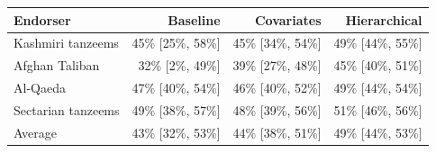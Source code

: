 \begin{tabular}{lrrr}
\toprule
Endorser & Baseline & Covariates & Hierarchical \\
\midrule
Kashmiri tanzeems & 45\% [25\%, 58\%] & 45\% [34\%, 54\%] & 49\% [44\%, 55\%] \\
Afghan Taliban & 32\% [2\%, 49\%] & 39\% [27\%, 48\%] & 45\% [40\%, 51\%] \\
Al-Qaeda & 47\% [40\%, 54\%] & 46\% [40\%, 52\%] & 49\% [44\%, 54\%] \\
Sectarian tanzeems & 49\% [38\%, 57\%] & 48\% [39\%, 56\%] & 51\% [46\%, 56\%] \\
\midrule
Average & 43\% [32\%, 53\%] & 44\% [38\%, 51\%] & 49\% [44\%, 53\%] \\
\bottomrule
\end{tabular}

